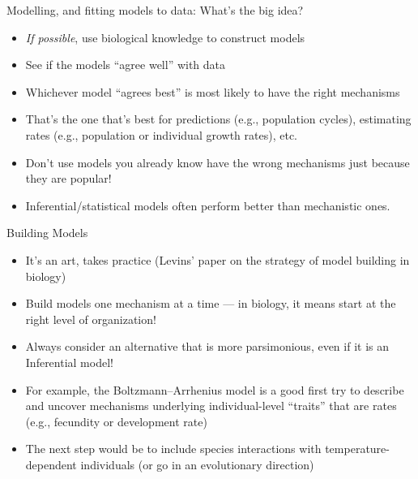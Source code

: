 \documentclass[xcolor=x11names,compress, handout]{beamer}
\renewcommand{\(}{\begin{columns}}
\renewcommand{\)}{\end{columns}}
\newcommand{\<}[1]{\begin{column}{#1}}
\renewcommand{\>}{\end{column}}
\begin{document}
\begin{frame}{Modelling, and fitting models to data: What's the big idea?}

\begin{itemize} [<+->] \itemsep8pt

	\item {\it If possible}, use biological knowledge to construct models
	\item See if the models ``agree well'' with data
	\item Whichever model ``agrees best'' is most likely to have the right 
	mechanisms
	\item That's the one that's best for predictions (e.g., population cycles), estimating rates (e.g., population or individual growth rates), etc.
	\item Don't use models you already know have the wrong mechanisms just because they are popular!
	\item Inferential/statistical models often perform better than mechanistic ones. 

\end{itemize}
  
\end{frame}


\begin{frame}{Building Models}

\begin{itemize}\itemsep10pt

	\item It's an art, takes practice (Levins' paper on the strategy of model building in biology)
	
	\item Build models one mechanism at a time --- in biology, it means 
	start at the right level of organization! 
	
	\item Always consider an alternative that is more parsimonious, even if 
	it is an Inferential model! 

	\item For example, the Boltzmann--Arrhenius model is a good first try to 
	describe and uncover mechanisms underlying individual-level ``traits'' that are rates (e.g., fecundity or development rate)

	\item The next step would be to include species interactions with 
	temperature-dependent individuals (or go in an evolutionary direction)

\end{itemize}   

\end{frame}
\end{document}
